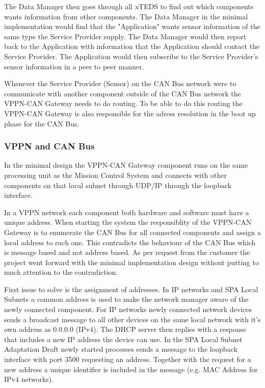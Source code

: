 The Data Manager then goes through all xTEDS to find out which components wants
information from other components. The Data Manager in the minimal
implementation would find that the "Application" wants sensor information of
the same type the Service Provider supply. The Data Manager would then report
back to the Application with information that the Application should contact
the Service Provider. The Application would then subscribe to the Service
Provider's sensor information in a peer to peer manner.

Whenever the Service Provider (Sensor) on the CAN Bus network were to communicate
with another component outside of the CAN Bus network the VPPN-CAN Gateway
needs to do routing. To be able to do this routing the VPPN-CAN Gateway is also
responsible for the adress resolution in the boot up phase for the CAN Bus.

\subsubsection{VPPN and CAN Bus}
In the minimal design the VPPN-CAN Gateway component runs on the same
processing unit as the Mission Control System and connects with other
components on that local subnet through UDP/IP through the loopback interface.

In a VPPN network each component both hardware and software must have a unique
address. When starting the system the responsiblity of the VPPN-CAN Gateway is to
enumerate the CAN Bus for all connected components and assign a local address to
each one. This contradicts the behaviour of the CAN Bus which is message based
and not address based. As per request from the customer the project went
forward with the minimal implementation design without putting to much attention to
the contradiction.

First issue to solve is the assignment of addresses. In IP networks and SPA Local
Subnets a common address is used to make the network manager aware of the newly
connected component. For IP networks newly connected network devices sends a
broadcast message to all other devices on the same local network with it's own
address as 0.0.0.0 (IPv4). The DHCP server then replies with a response that
includes a new IP address the device can use. In the SPA Local Subnet
Adaptation Draft newly started processes sends a message to the loopback
interface with port 3500 requesting an address. Together with the request for a
new address a unique identifier is included in the message (e.g. MAC Address
for IPv4 networks).

